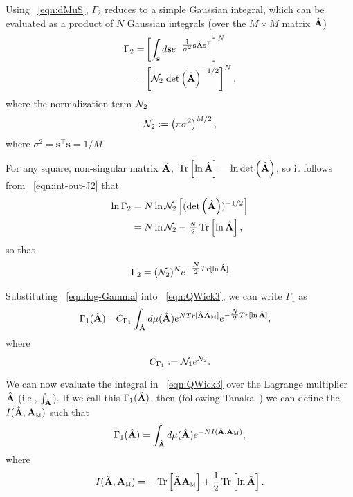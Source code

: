 Using \EQN~\ref{eqn:dMuS}, 
$\Gamma_2$ reduces to a simple Gaussian integral, which can be evaluated as a product of $N$ Gaussian integrals (over the $M\times M$ matrix $\hat{\mathbf{A}}$)
\begin{align}
\label{eqn:int-out-J2}
\Gamma_2
   =& \left[\int_{{\mathbf{s}}} d\mathbf{s}e^{-\tfrac{1}{\sigma^{2}} \mathbf{s}\hat{\mathbf{A}}\mathbf{s}^{\top} }\right]^{N} \\
   =& \left[\mathcal{N}_2\;\mbox{}{\text{det}}\left(\hat{\mathbf{A}}\right)^{-1/2}\right]^{N}  ,
\end{align}
where the normalization term $\mathcal{N}_2$
\begin{align}
\label{eqn:norm_2}
\mathcal{N}_2 := \left(\pi\sigma^{2}\right)^{M/2}  ,
\end{align}
where $\sigma^{2}=\mathbf{s}^{\top}\mathbf{s}=1/M$

For any square, non-singular matrix $\hat{\mathbf{A}}$,  $ \mbox{}\operatorname{Tr}\left[\ln\hat{\mathbf{A}}\right]=\ln \mbox{}{\text{det}}\left(\hat{\mathbf{A}}\right)$, so
it follows from \EQN~\ref{eqn:int-out-J2} that
\begin{align}
\nonumber
\ln\Gamma_2
   &=N\ln\NORM_2\left[( \Det \AHAT)^{-1/2} \right]  \\   %
&= N\ln\NORM_2 -\tfrac{N}{2}\Trace{ \ln\AHAT }  ,
\end{align}
so that
\begin{align}
\label{eqn:log-Gamma}
\Gamma_2 = (\mathcal{N}_2)^{N} e^{ -\tfrac{N}{2} Tr[ \ln\hat{\mathbf{A}} ] } 
\end{align}

Substituting
\EQN~\ref{eqn:log-Gamma}
into \EQN~\ref{eqn:QWick3},
we can write $\Gamma_1$ as
\begin{eqnarray}
  \label{eqn:gamma1}
\Gamma_1(\hat{\mathbf{A}})  =& C_{\Gamma_1}\int_{\hat{\mathbf{A}}} d\mu(\hat{\mathbf{A}})   e^{ N Tr[ \hat{\mathbf{A}}{\mathbf{A}}_{\text{\tiny M}} ] }  e^{ -\tfrac{N}{2} Tr[ \ln\hat{\mathbf{A}} ] }  ,
\end{eqnarray}
where
\begin{equation}
    C_{\Gamma_1}:=\mathcal{N}_1 e^{\mathcal{N}_2}.
\end{equation}

We can now evaluate the integral in \EQN~\ref{eqn:QWick3} over the Lagrange multiplier $\hat{\mathbf{A}}$ (i.e., $\int_{\hat{\mathbf{A}}} $). 
If we call this $\Gamma_1(\hat{\mathbf{A}})$,
then (following Tanaka~\cite{Tanaka2008}) we can define the \emph{\RateFunction} $I(\hat{\mathbf{A}},{\mathbf{A}}_{\text{\tiny M}})$ such that
\begin{align}
\label{eqn:LambdaA}
\Gamma_1(\hat{\mathbf{A}})=\int_{\hat{\mathbf{A}}}  d\mu(\hat{\mathbf{A}}) e^{-NI(\hat{\mathbf{A}},{\mathbf{A}}_{\text{\tiny M}})}  ,
\end{align}
where
\begin{align}
\label{eqn:IAA}
I(\hat{\mathbf{A}},{\mathbf{A}}_{\text{\tiny M}}) = -\mbox{}\operatorname{Tr}\left[ \hat{\mathbf{A}}{\mathbf{A}}_{\text{\tiny M}}\right] + \frac{1}{2}\mbox{}\operatorname{Tr}\left[ \ln\hat{\mathbf{A}} \right]  .
\end{align}


